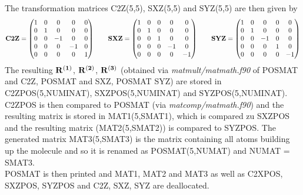 \documentclass[a4paper,10pt]{scrartcl}
\begin{document}
The transformation matrices C2Z(5,5), SXZ(5,5) and SYZ(5,5) are then given by
\[ \bf{C2Z} = \begin{pmatrix} 1 & 0 & 0 & 0 & 0 \\
                                  0 & 1 & 0 & 0 & 0 \\
                                  0 & 0 & -1 & 0 & 0 \\
                                  0 & 0 & 0 & -1 & 0 \\
                                  0 & 0 & 0 & 0 & 1
                  \end{pmatrix}\qquad
   \bf{SXZ} = \begin{pmatrix}     1 & 0 & 0 & 0 & 0 \\
                                  0 & 1 & 0 & 0 & 0 \\
                                  0 & 0 & 1 & 0 & 0 \\
                                  0 & 0 & 0 & -1 & 0 \\
                                  0 & 0 & 0 & 0 & -1
                  \end{pmatrix}\qquad   
    \bf{SYZ} = \begin{pmatrix}    1 & 0 & 0 & 0 & 0 \\
                                  0 & 1 & 0 & 0 & 0 \\
                                  0 & 0 & -1 & 0 & 0 \\
                                  0 & 0 & 0 & 1 & 0 \\
                                  0 & 0 & 0 & 0 & -1
                  \end{pmatrix}              \]
The resulting $\bf{R}^{(1)}$, $\bf{R}^{(2)}$, $\bf{R}^{(3)}$ (obtained via \emph{matmult/matmath.f90} of POSMAT and C2Z, POSMAT and SXZ, POSMAT SYZ) are
stored in C2ZPOS(5,NUMINAT), SXZPOS(5,NUMINAT) and SYZPOS(5,NUMINAT). C2ZPOS is then compared to POSMAT
(via \emph{matcomp/matmath.f90}) and the resulting matrix is stored in MAT1(5,SMAT1), which is compared zu SXZPOS
 and the resulting matrix (MAT2(5,SMAT2)) is compared to SYZPOS. The generated matrix MAT3(5,SMAT3)
is the matrix containing all atoms building up the molecule and so it is renamed as POSMAT(5,NUMAT) and NUMAT = SMAT3.\\
POSMAT is then printed and MAT1, MAT2 and MAT3 as well as C2XPOS, SXZPOS, SYZPOS and C2Z, SXZ, SYZ are deallocated.                  
                  
\end{document}
